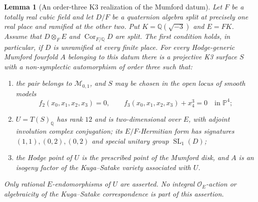 \documentclass[11pt]{article}
\newtheorem{lemma}[theorem]{Lemma}
\theoremstyle{definition}
\theoremstyle{remark}
\begin{document}
\begin{lemma}[An order-three K3 realization of the Mumford datum]
\label{clifford-lem:k3-realization}
Let $F$ be a totally real cubic field and let $D/F$ be a quaternion
algebra split at precisely one real place and ramified at the other two.
Put $K=\mathbb Q(\sqrt{-3})$ and $E=FK$.
Assume that $D\otimes_FE$ and $\operatorname{Cor}_{F/\mathbb Q}D$
are split.  The first condition holds, in particular, if $D$ is
unramified at every finite place.
For every Hodge-generic Mumford fourfold $A$ belonging to this datum
there is a projective K3 surface $S$ with a non-symplectic automorphism
of order three such that:
\begin{enumerate}
\item the pair belongs to $\mathcal M_{0,1}$, and $S$ may be chosen in
the open locus of smooth models
\[
 f_2(x_0,x_1,x_2,x_3)=0,\qquad
 f_3(x_0,x_1,x_2,x_3)+x_4^3=0
 \quad\text{in }\mathbb P^4;
\]
\item $U=T(S)_{\mathbb Q}$ has rank $12$ and is two-dimensional over
$E$, with adjoint involution complex conjugation; its $E/F$-Hermitian
form has signatures $(1,1),(0,2),(0,2)$ and special unitary group
$\operatorname{SL}_1(D)$;
\item the Hodge point of $U$ is the prescribed point of the
Mumford disk, and $A$ is an isogeny factor of the Kuga--Satake
variety associated with $U$.
\end{enumerate}
Only rational $E$-endomorphisms of $U$ are asserted.  No integral
$\mathcal O_E$-action or algebraicity of the Kuga--Satake
correspondence is part of this assertion.
\end{lemma}
\end{document}
